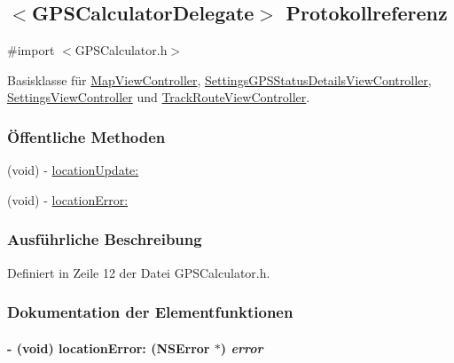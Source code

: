 \hypertarget{protocol_g_p_s_calculator_delegate-p}{
\subsection{$<$GPSCalculatorDelegate$>$ Protokollreferenz}
\label{protocol_g_p_s_calculator_delegate-p}
}


{\ttfamily \#import $<$GPSCalculator.h$>$}

Basisklasse für \hyperlink{interface_map_view_controller}{MapViewController}, \hyperlink{interface_settings_g_p_s_status_details_view_controller}{SettingsGPSStatusDetailsViewController}, \hyperlink{interface_settings_view_controller}{SettingsViewController} und \hyperlink{interface_track_route_view_controller}{TrackRouteViewController}.\subsubsection*{Öffentliche Methoden}
\begin{DoxyCompactItemize}
\item 
(void) -\/ \hyperlink{protocol_g_p_s_calculator_delegate-p_a0adb149b836a8e03a11ea255a5f01a31}{locationUpdate:}
\item 
(void) -\/ \hyperlink{protocol_g_p_s_calculator_delegate-p_a890f58f3468025f475f8bb7d9aa33332}{locationError:}
\end{DoxyCompactItemize}


\subsubsection{Ausführliche Beschreibung}


Definiert in Zeile 12 der Datei GPSCalculator.h.

\subsubsection{Dokumentation der Elementfunktionen}
\hypertarget{protocol_g_p_s_calculator_delegate-p_a890f58f3468025f475f8bb7d9aa33332}{
\paragraph[{locationError:}]{\setlength{\rightskip}{0pt plus 5cm}-\/ (void) locationError: (NSError $\ast$) {\em error}}\hfill}
\label{protocol_g_p_s_calculator_delegate-p_a890f58f3468025f475f8bb7d9aa33332}


